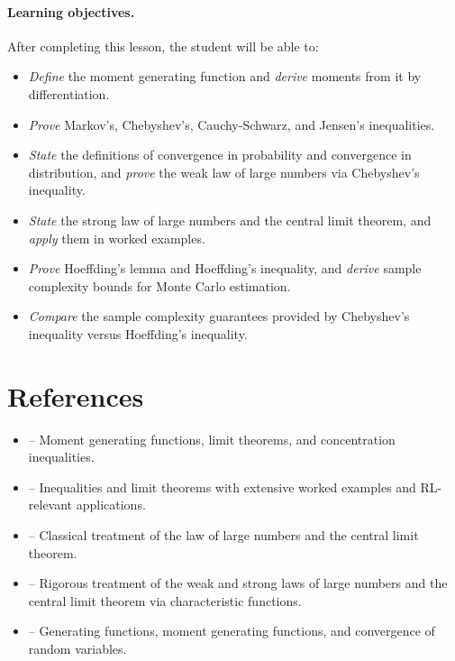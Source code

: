 \documentclass[11pt,a4paper]{article}
\begin{document}
\paragraph{Learning objectives.}
After completing this lesson, the student will be able to:
\begin{itemize}
    \item \emph{Define} the moment generating function and \emph{derive}
    moments from it by differentiation.
    \item \emph{Prove} Markov's, Chebyshev's, Cauchy-Schwarz, and
    Jensen's inequalities.
    \item \emph{State} the definitions of convergence in probability
    and convergence in distribution, and \emph{prove} the weak law of
    large numbers via Chebyshev's inequality.
    \item \emph{State} the strong law of large numbers and the central
    limit theorem, and \emph{apply} them in worked examples.
    \item \emph{Prove} Hoeffding's lemma and Hoeffding's inequality,
    and \emph{derive} sample complexity bounds for Monte Carlo
    estimation.
    \item \emph{Compare} the sample complexity guarantees provided by
    Chebyshev's inequality versus Hoeffding's inequality.
\end{itemize}


\section{References}
\label{sec:references}

\begin{itemize}
    \item \citet[Chapters 7--8]{ross2019} -- Moment generating
    functions, limit theorems, and concentration inequalities.
    \item \citet[Chapter 10]{blitzstein2019} -- Inequalities and
    limit theorems with extensive worked examples and RL-relevant
    applications.
    \item \citet[Chapters 8--10]{feller1968} -- Classical treatment
    of the law of large numbers and the central limit theorem.
    \item \citet[Sections 2.2--2.3]{durrett2019} -- Rigorous
    treatment of the weak and strong laws of large numbers and the
    central limit theorem via characteristic functions.
    \item \citet[Sections 5.1--5.4]{grimmett2020} -- Generating
    functions, moment generating functions, and convergence of random
    variables.
\end{itemize}
\end{document}
